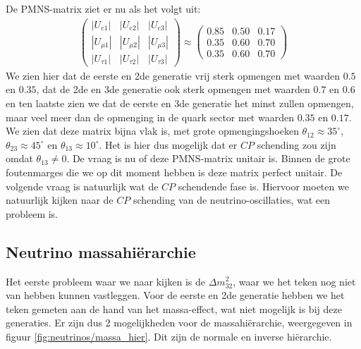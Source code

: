 \documentclass[../main.tex]{subfiles}
\begin{document}
De PMNS-matrix ziet er nu als het volgt uit:
\begin{equation}
    \begin{aligned}
        \label{eq:pmns_matrix_ingevuld}
        \left(\begin{array}{ccc}
                \left|U_{e 1}\right| & \left|U_{e 2}\right| & \left|U_{e 3}\right| \\
                \left|U_{\mu 1}\right| & \left|U_{\mu 2}\right| & \left|U_{\mu 3}\right| \\
                \left|U_{\tau 1}\right| & \left|U_{\tau 2}\right| & \left|U_{\tau 3}\right|
                \end{array}\right) \approx\left(\begin{array}{ccc}
                0.85 & 0.50 & 0.17 \\
                0.35 & 0.60 & 0.70 \\
                0.35 & 0.60 & 0.70
        \end{array}\right)
    \end{aligned}
\end{equation}
We zien hier dat de eerste en 2de generatie vrij sterk opmengen met waarden $0.5$ en $0.35$, dat de 2de en 3de generatie ook sterk opmengen met waarden $0.7$ en $0.6$ en ten laatste zien we dat de eerste en 3de generatie het minst zullen opmengen, maar veel meer dan de opmenging in de quark sector met waarden $0.35$ en $0.17$. We zien dat deze matrix bijna vlak is, met grote opmengingshoeken $\theta_{12} \approx 35^{\circ}$, $\theta_{23} \approx 45^{\circ}$ en $\theta_{13} \approx 10^{\circ}$. Het is hier dus mogelijk dat er $CP$ schending zou zijn omdat $\theta_{13} \neq 0$. De vraag is nu of deze PMNS-matrix unitair is. Binnen de grote foutenmarges die we op dit moment hebben is deze matrix perfect unitair. De volgende vraag is natuurlijk wat de $CP$ schendende fase is. Hiervoor moeten we natuurlijk kijken naar de $CP$ schending van de neutrino-oscillaties, wat een probleem is.

\subsection{Neutrino massahiërarchie}%
\label{sub:neutrino_massa_hierarchie}

Het eerste probleem waar we naar kijken is de $\Delta m_{32}^2$, waar we het teken nog niet van hebben kunnen vastleggen. Voor de eerste en 2de generatie hebben we het teken gemeten aan de hand van het massa-effect, wat niet mogelijk is bij deze generaties. Er zijn dus 2 mogelijkheden voor de massahiërarchie, weergegeven in figuur \ref{fig:neutrinos/massa_hier}. Dit zijn de normale en inverse hiërarchie.
\end{document}
